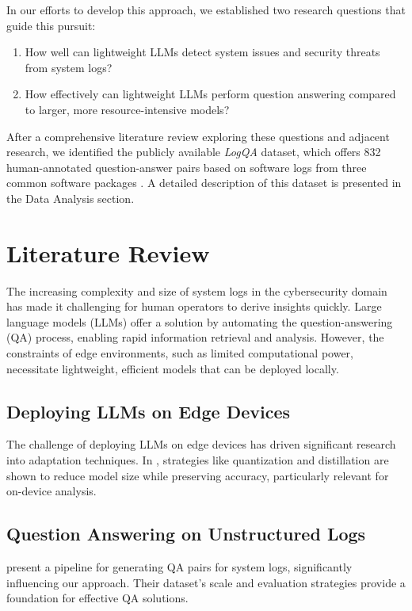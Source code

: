 \documentclass[11pt]{article}
\begin{document}
In our efforts to develop this approach, we established two research questions that guide this pursuit:
\begin{enumerate}
    \item How well can lightweight LLMs detect system issues and security threats from system logs?
    \item How effectively can lightweight LLMs perform question answering compared to larger, more resource-intensive models?
\end{enumerate}

After a comprehensive literature review exploring these questions and adjacent research, we identified the publicly available \textit{LogQA} dataset, which offers 832 human-annotated question-answer pairs based on software logs from three common software packages \cite{huang2024}. A detailed description of this dataset is presented in the Data Analysis section.

\section{Literature Review}
The increasing complexity and size of system logs in the cybersecurity domain has made it challenging for human operators to derive insights quickly. Large language models (LLMs) offer a solution by automating the question-answering (QA) process, enabling rapid information retrieval and analysis. However, the constraints of edge environments, such as limited computational power, necessitate lightweight, efficient models that can be deployed locally.

\subsection{Deploying LLMs on Edge Devices}
The challenge of deploying LLMs on edge devices has driven significant research into adaptation techniques. In \citet{wang2024}, strategies like quantization and distillation are shown to reduce model size while preserving accuracy, particularly relevant for on-device analysis.

\subsection{Question Answering on Unstructured Logs}
\citet{huang2024gloss} present a pipeline for generating QA pairs for system logs, significantly influencing our approach. Their dataset's scale and evaluation strategies provide a foundation for effective QA solutions.
\end{document}
